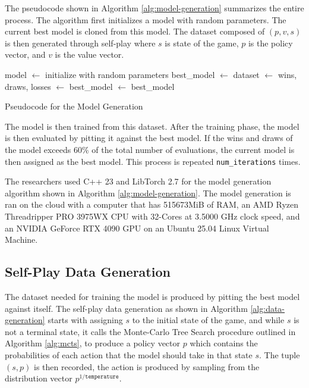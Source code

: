 The pseudocode shown in Algorithm \ref{alg:model-generation} summarizes the entire process. 
The algorithm first initializes a model with random parameters. The current best model is cloned from this model. The dataset composed of $(p, v, s)$ is then generated through self-play where $s$ is state of the game, $p$ is the policy vector, and $v$ is the value vector.

\begin{algorithm}[H]
    \begin{algorithmic}[1]
          \State model $\gets$ initialize with random parameters
          \State best\_model $\gets$ 
          \Repeat
            \State dataset $\gets$ 
            \State {}
            \State wins, draws, losses $\gets$ 
                \State best\_model $\gets$ 
            \EndIf
           \State \Return best\_model
        \EndFunction
    \end{algorithmic}
    \caption{Pseudocode for the Model Generation}
    \label{alg:model-generation}
\end{algorithm}

The model is then trained from this dataset. After the training phase, the model is then evaluated by pitting it against the best model. If the wins and draws of the model exceeds $60\%$ of the total number of evaluations, the current model is then assigned as the best model. This process is repeated \texttt{num\_iterations} times.

The researchers used C++ 23 and LibTorch 2.7 for the model generation algorithm shown in Algorithm \ref{alg:model-generation}.  The model generation is ran on the cloud with a computer that has 515673MiB of RAM, an AMD Ryzen Threadripper PRO 3975WX CPU with 32-Cores at 3.5000 GHz clock speed, and an NVIDIA GeForce RTX 4090 GPU on an Ubuntu 25.04 Linux Virtual Machine.

\subsection{Self-Play Data Generation}

The dataset needed for training the model is produced by pitting the best model against itself. The self-play data generation as shown in Algorithm \ref{alg:data-generation} starts with assigning $s$ to the initial state of the game, and while $s$ is not a terminal state, it calls the Monte-Carlo Tree Search procedure outlined in Algorithm \ref{alg:mcts}, to produce a policy vector $p$ which contains the probabilities of each action that the model should take in that state $s$. The tuple $(s, p)$ is then recorded, the action is produced by sampling from the distribution vector $p^{1/\texttt{temperature}}$. 

